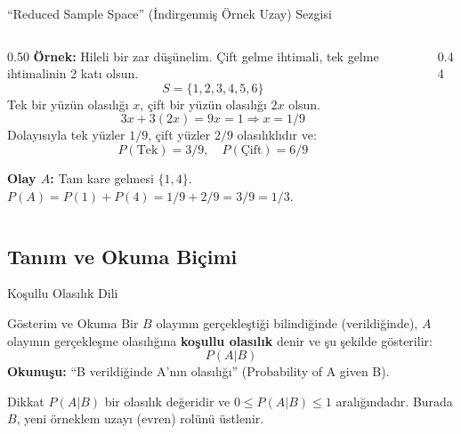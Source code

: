 \documentclass[light]{lutbeamer}
\begin{document}
\begin{frame}{``Reduced Sample Space'' (İndirgenmiş Örnek Uzay) Sezgisi}
    \begin{columns}[T]
        \begin{column}{0.50\textwidth}
            \small
            \textbf{Örnek:} Hileli bir zar düşünelim. Çift gelme ihtimali, tek gelme ihtimalinin 2 katı olsun.
            \[ S = \{1, 2, 3, 4, 5, 6\} \]
            Tek bir yüzün olasılığı $x$, çift bir yüzün olasılığı $2x$ olsun.
            \[ 3x + 3(2x) = 9x = 1 \Rightarrow x = 1/9 \]
            Dolayısıyla tek yüzler $1/9$, çift yüzler $2/9$ olasılıklıdır ve:
            \[ P(\text{Tek}) = 3/9,\quad P(\text{Çift}) = 6/9 \]
            
            \vspace{0.1cm}
            \textbf{Olay $A$:} Tam kare gelmesi $\{1, 4\}$.
            $P(A) = P(1) + P(4) = 1/9 + 2/9 = 3/9 = 1/3$.
        \end{column}
        \begin{column}{0.44\textwidth}
        \end{column}
    \end{columns}
\end{frame}

\subsection{Tanım ve Okuma Biçimi}

\begin{frame}{Koşullu Olasılık Dili}
    \begin{block}{Gösterim ve Okuma}
        Bir $B$ olayının gerçekleştiği bilindiğinde (verildiğinde), $A$ olayının gerçekleşme olasılığına \textbf{koşullu olasılık} denir ve şu şekilde gösterilir:
        \[ P(A|B) \]
        \textbf{Okunuşu:} ``B verildiğinde A'nın olasılığı'' (Probability of A given B).
    \end{block}

    \begin{alertblock}{Dikkat}
        $P(A|B)$ bir olasılık değeridir ve $0 \le P(A|B) \le 1$ aralığındadır.
        Burada $B$, yeni örneklem uzayı (evren) rolünü üstlenir.
    \end{alertblock}
\end{frame}
\end{document}
